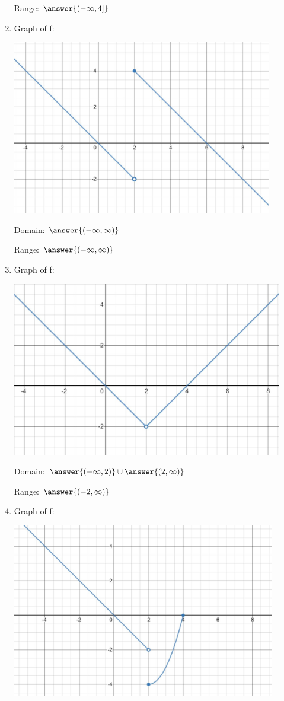 \documentclass{ximera}
\begin{document}
\begin{problem}
\begin{enumerate}
 Range:  $\answer{(-\infty,4]}$
 \item Graph of f:
     \begin{image}
   \includegraphics[height=3in]{160H2pic3.jpg}
 \end{image}
 
 Domain: $\answer{(-\infty,\infty)}$
 
 Range: $\answer{(-\infty,\infty)}$
 \item Graph of f:
     \begin{image}
   \includegraphics[height=3in]{160H2pic4.jpg}
 \end{image}
 
 Domain:  $\answer{(-\infty,2)}\cup\answer{(2,\infty)}$
 
 Range: $\answer{(-2,\infty)}$
 \item Graph of f:
     \begin{image}
   \includegraphics[height=3in]{160H2pic5.jpg}
 \end{image}
 

\end{enumerate}
\end{problem}
\end{document}
